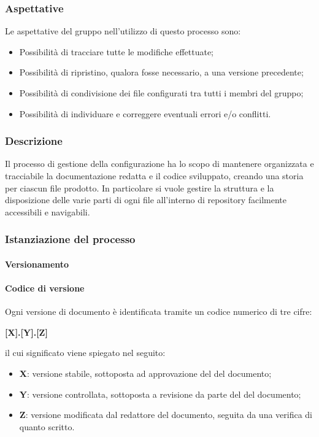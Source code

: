 \subsubsection{Aspettative}
Le aspettative del gruppo \groupName{} nell'utilizzo di questo processo sono:
\begin{itemize}
    \item Possibilità di tracciare tutte le modifiche effettuate;
    \item Possibilità di ripristino, qualora fosse necessario, a una versione precedente;
    \item Possibilità di condivisione dei file configurati tra tutti i membri del gruppo;
    \item Possibilità di individuare e correggere eventuali errori e/o conflitti.
\end{itemize}

\subsubsection{Descrizione}
Il processo di gestione della configurazione ha lo scopo di mantenere organizzata e tracciabile la documentazione redatta e il codice sviluppato, creando una storia per ciascun file prodotto.
In particolare si vuole gestire la struttura e la disposizione delle varie parti di ogni file all'interno di repository\glo{} facilmente accessibili e navigabili.
\subsubsection{Istanziazione del processo}
\paragraph{Versionamento} \label{paragraph:versionamento}
\paragraph*{Codice di versione}
Ogni versione di documento è identificata tramite un codice numerico di tre cifre:
\begin{center}
    \Large \textbf{[X].[Y].[Z]}
\end{center}
il cui significato viene spiegato nel seguito:
\begin{itemize}
    \item \textbf{X}: versione stabile, sottoposta ad approvazione del \roleProjectManagerLow{} del documento;
    \item \textbf{Y}: versione controllata, sottoposta a revisione da parte del \roleVerifierLow{} del documento;
    \item \textbf{Z}: versione modificata dal redattore del documento, seguita da una verifica di quanto scritto.
\end{itemize}


